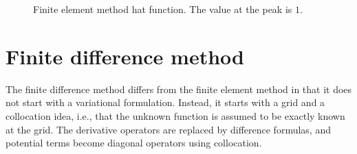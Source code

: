 \documentclass{article}
\begin{document}
\begin{figure}[htbp]
    \centering
    \caption{Finite element method hat function. The value at the peak is $1$.}
    \label{fig:fem-basis}
\end{figure}






\section{Finite difference method}


The finite difference method differs from the finite element method in that it
does not start with a variational formulation. Instead, it starts with a grid and a collocation idea, i.e., that the unknown function is assumed to be exactly known at the grid. The derivative operators are replaced by difference formulas, and potential terms become diagonal operators using collocation.
\end{document}
